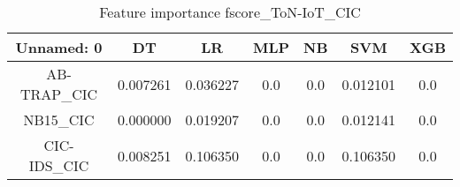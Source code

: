 \begin{table}[H]
\centering
\caption{Feature importance fscore_ToN-IoT_CIC}
\label{fscore_ToN-IoT_CIC}
\begin{tabular}{ccccccc}
\toprule
 Unnamed: 0 &       DT &       LR &  MLP &  NB &      SVM &  XGB \\
\midrule
AB-TRAP\_CIC & 0.007261 & 0.036227 &  0.0 & 0.0 & 0.012101 &  0.0 \\
   NB15\_CIC & 0.000000 & 0.019207 &  0.0 & 0.0 & 0.012141 &  0.0 \\
CIC-IDS\_CIC & 0.008251 & 0.106350 &  0.0 & 0.0 & 0.106350 &  0.0 \\
\bottomrule
\end{tabular}
\end{table}
